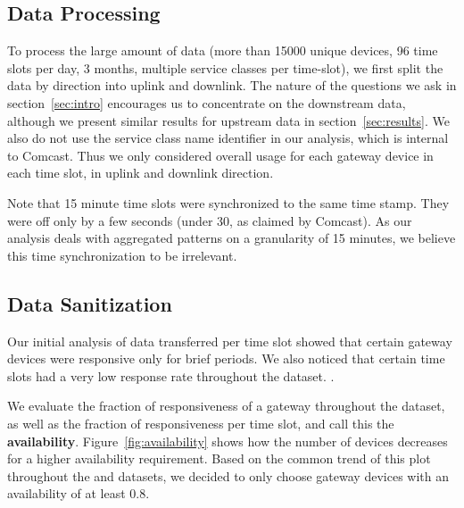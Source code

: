 \subsection{Data Processing}

To process the large amount of data (more than 15000 unique devices, 96 time slots per day, 3 months, multiple service classes per time-slot), we first split the data by direction into uplink and downlink. The nature of the questions we ask in section~\ref{sec:intro} encourages us to concentrate on the downstream data, although we present similar results for upstream data in section~\ref{sec:results}. We also do not use the service class name identifier in our analysis, which is internal to Comcast.  Thus we only considered overall usage for each gateway device in each time slot, in uplink and downlink direction.

Note that 15 minute time slots were synchronized to the same time stamp. They were off only by a few seconds (under 30, as claimed by Comcast). As our analysis deals with aggregated patterns on a granularity of 15 minutes, we believe this time synchronization to be irrelevant.

\subsection{Data Sanitization}

Our initial analysis of data transferred per time slot showed that certain gateway devices were responsive only for brief periods. We also noticed that certain time slots had a very low response rate throughout the dataset. .

We evaluate the fraction of responsiveness of a gateway throughout the dataset, as well as the fraction of responsiveness per time slot, and call this the \textbf{availability}. Figure~\ref{fig:availability} shows how the number of devices decreases for a higher availability requirement. Based on the common trend of this plot throughout the \test and \control datasets, we decided to only choose gateway devices with an availability of at least 0.8.


